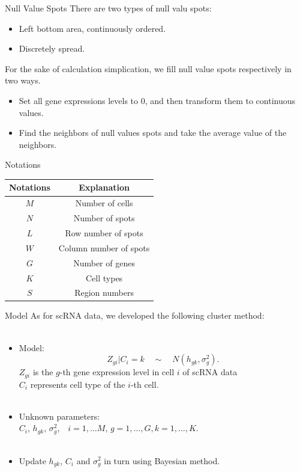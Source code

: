 \documentclass[10 pt]{beamer}
\begin{document}
\begin{frame}{Null Value Spots}
There are two types of null valu spots:
\begin{itemize}
	\item Left bottom area, continuously ordered.
	\item Discretely spread.
	\end{itemize}
For the sake of calculation simplication, we fill  null value spots respectively in two ways.
\begin{itemize}
	\item Set all gene expressions levels to 0, and then transform them to continuous values.
	\item Find the neighbors of null values spots and take the average value of the neighbors.
\end{itemize}
\end{frame}

\begin{frame}{Notations}
\begin{table}
\begin{tabular}{c|c}
	\hline
	Notations & Explanation \\
	\hline
	$M$ & Number of cells \\
	\hline
	$N$ & Number of spots \\
	\hline
	$L$ & Row number of spots \\
	\hline 
	$W$ & Column number of spots \\
	\hline
	$G$ & Number of genes \\
	\hline
	$K$ & Cell types \\
	\hline 
	$S$ &Region numbers\\
	\hline
	
\end{tabular}
\end{table}
\end{frame}

\begin{frame}{Model}
As for scRNA data, we developed the following cluster method:
~\\
~\\
\begin{itemize}
	\item Model: {\tiny $$Z_{gi}|C_i = k \quad \sim\quad N(h_{gk}, \sigma^2_g).$$
	$Z_{gi}$ is the $g$-th gene expression level in cell $i$ of scRNA data\\
$C_i$ represents cell type of the $i$-th cell.}
~\\
~\\
\item Unknown parameters: \\
$C_i$,  $ h_{gk} $, $ \sigma^2_g$,$\quad i = 1,\dots M$, $g = 1,\dots,G, k = 1,\dots, K$.
~\\
~\\
\item Update $h_{gk}$, $C_i$ and $\sigma^2_g$ in turn using Bayesian method.
\end{itemize}
\end{frame}
\end{document}
